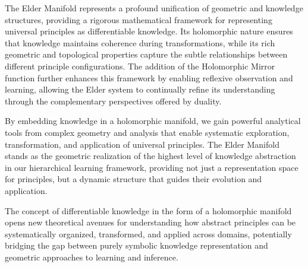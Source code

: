 The Elder Manifold represents a profound unification of geometric and knowledge structures, providing a rigorous mathematical framework for representing universal principles as differentiable knowledge. Its holomorphic nature ensures that knowledge maintains coherence during transformations, while its rich geometric and topological properties capture the subtle relationships between different principle configurations. The addition of the Holomorphic Mirror function further enhances this framework by enabling reflexive observation and learning, allowing the Elder system to continually refine its understanding through the complementary perspectives offered by duality.

By embedding knowledge in a holomorphic manifold, we gain powerful analytical tools from complex geometry and analysis that enable systematic exploration, transformation, and application of universal principles. The Elder Manifold stands as the geometric realization of the highest level of knowledge abstraction in our hierarchical learning framework, providing not just a representation space for principles, but a dynamic structure that guides their evolution and application.

The concept of differentiable knowledge in the form of a holomorphic manifold opens new theoretical avenues for understanding how abstract principles can be systematically organized, transformed, and applied across domains, potentially bridging the gap between purely symbolic knowledge representation and geometric approaches to learning and inference.
